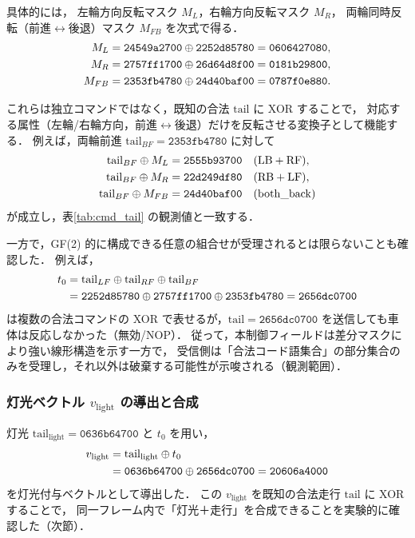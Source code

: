 \documentclass[twocolumn,10pt,a4paper]{jsarticle}
\begin{document}
具体的には，
左輪方向反転マスク $M_L$，右輪方向反転マスク $M_R$，
両輪同時反転（前進$\leftrightarrow$後退）マスク $M_{FB}$ を次式で得る．
{\small
\begin{align}
M_L   &= \texttt{24549a2700} \oplus \texttt{2252d85780} = \texttt{0606427080}, \notag\\
M_R   &= \texttt{2757ff1700} \oplus \texttt{26d64d8f00} = \texttt{0181b29800}, \notag\\
M_{FB}&= \texttt{2353fb4780} \oplus \texttt{24d40baf00} = \texttt{0787f0e880}. \notag
\end{align}
}

これらは独立コマンドではなく，既知の合法 $\mathrm{tail}$ に XOR することで，
対応する属性（左輪/右輪方向，前進$\leftrightarrow$後退）だけを反転させる変換子として機能する．
例えば，両輪前進 $\mathrm{tail}_{BF}=\texttt{2353fb4780}$ に対して
{\footnotesize
\begin{align}
\mathrm{tail}_{BF}\oplus M_L &= \texttt{2555b93700} \quad(\mathrm{LB+RF}),\notag\\
\mathrm{tail}_{BF}\oplus M_R &= \texttt{22d249df80} \quad(\mathrm{RB+LF}),\notag\\
\mathrm{tail}_{BF}\oplus M_{FB} &= \texttt{24d40baf00} \quad(\mathrm{both\_back})\notag
\end{align}
}
が成立し，表\ref{tab:cmd_tail} の観測値と一致する．

一方で，GF(2) 的に構成できる任意の組合せが受理されるとは限らないことも確認した．
例えば，
{\small
\begin{align}
t_0 &= \mathrm{tail}_{LF}\oplus \mathrm{tail}_{RF}\oplus \mathrm{tail}_{BF} \notag\\
&= \texttt{2252d85780}\oplus\texttt{2757ff1700}\oplus\texttt{2353fb4780}
= \texttt{2656dc0700} \notag
\end{align}
}%
は複数の合法コマンドの XOR で表せるが，$\mathrm{tail}=\texttt{2656dc0700}$ を送信しても車体は反応しなかった（無効/NOP）．
従って，本制御フィールドは差分マスクにより強い線形構造を示す一方で，
受信側は「合法コード語集合」の部分集合のみを受理し，それ以外は破棄する可能性が示唆される（観測範囲）．

\subsubsection{灯光ベクトル $v_{\mathrm{light}}$ の導出と合成}
灯光 $\mathrm{tail}_{\mathrm{light}}=\texttt{0636b64700}$ と $t_0$ を用い，
{\footnotesize
\begin{align}
v_{\mathrm{light}}
&=\mathrm{tail}_{\mathrm{light}}\oplus t_0\notag\\
&=\texttt{0636b64700}\oplus\texttt{2656dc0700}=\texttt{20606a4000}\notag
\end{align}
}%
を灯光付与ベクトルとして導出した．
この $v_{\mathrm{light}}$ を既知の合法走行 $\mathrm{tail}$ に XOR することで，
同一フレーム内で「灯光＋走行」を合成できることを実験的に確認した（次節）．
\end{document}

